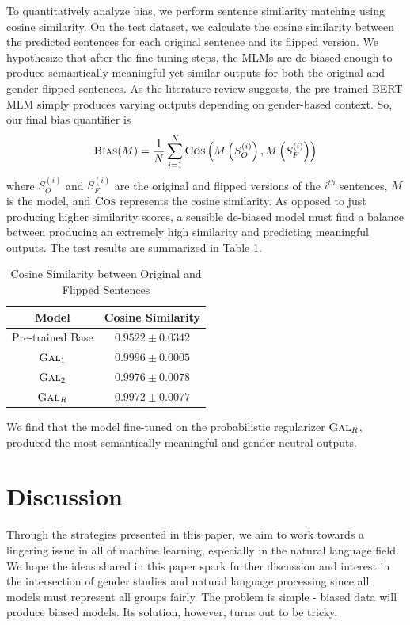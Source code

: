 \documentclass[10pt,twocolumn,letterpaper]{article}
\begin{document}
To quantitatively analyze bias, we perform sentence similarity matching using cosine similarity.
On the test dataset, we calculate the cosine similarity between the predicted sentences for each original sentence and its flipped version.
We hypothesize that after the fine-tuning steps, the MLMs are de-biased enough to produce semantically meaningful yet similar outputs for both the original and gender-flipped sentences.
As the literature review suggests, the pre-trained BERT MLM simply produces varying outputs depending on gender-based context.
So, our final bias quantifier is
\begin{equation}
    \textsc{Bias}(M) = \frac{1}{N} \sum_{i=1}^{N} \textsc{Cos}\left( M\left( S_{O}^{(i)} \right), M\left( S_{F}^{(i)} \right) \right)
\end{equation}
where $S_{O}^{(i)}$ and $S_{F}^{(i)}$ are the original and flipped versions of the $i^{th}$ sentences, $M$ is the model, and $\textsc{Cos}$ represents the cosine similarity.
As opposed to just producing higher similarity scores, a sensible de-biased model must find a balance between producing an extremely high similarity and predicting meaningful outputs.
The test results are summarized in Table \ref{tab:cosine-sim}.
\begin{table}
    \centering
    \begin{tabular}{c|c}
         \textbf{Model} & \textbf{Cosine Similarity} \\
         \hline
         Pre-trained Base & $0.9522 \pm 0.0342$ \\
         $\textsc{Gal}_{1}$ & $0.9996 \pm 0.0005$ \\
         $\textsc{Gal}_{2}$ & $0.9976 \pm 0.0078$ \\
         $\textsc{Gal}_{R}$ & $0.9972 \pm 0.0077$
    \end{tabular}
    \caption{Cosine Similarity between Original and Flipped Sentences}
    \label{tab:cosine-sim}
\end{table}

We find that the model fine-tuned on the probabilistic regularizer $\textsc{Gal}_{R}$, produced the most semantically meaningful and gender-neutral outputs.

\section{Discussion}
Through the strategies presented in this paper, we aim to work towards a lingering issue in all of machine learning, especially in the natural language field.
We hope the ideas shared in this paper spark further discussion and interest in the intersection of gender studies and natural language processing since all models must represent all groups fairly.
The problem is simple - biased data will produce biased models.
Its solution, however, turns out to be tricky.
\end{document}
